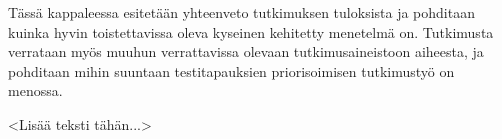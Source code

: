Tässä kappaleessa esitetään yhteenveto tutkimuksen tuloksista ja pohditaan kuinka hyvin toistettavissa oleva kyseinen kehitetty menetelmä on.
Tutkimusta verrataan myös muuhun verrattavissa olevaan tutkimusaineistoon aiheesta, ja pohditaan mihin suuntaan testitapauksien priorisoimisen tutkimustyö on menossa.

<Lisää teksti tähän...>